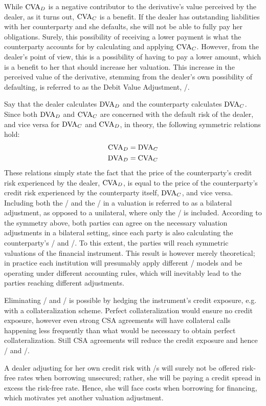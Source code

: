 \documentclass[main.tex]{subfiles}
\begin{document}
        While $\CVA/_{D}$ is a negative contributor to the derivative's value perceived by the dealer, 
        as it turns out, $\CVA/_{C}$ is a benefit.
        If the dealer has outstanding liabilities with her counterparty
        and she defaults, she will not be able to fully pay her obligations. 
        Surely, this possibility of receiving a lower payment is what the counterparty accounts for 
        by calculating and applying $\CVA/_{C}$.
        However, from the dealer's point of view, this is a possibility of having to pay a lower amount,
        which is a benefit to her that should increase her valuation.
        This increase in the perceived value of the derivative,
        stemming from the dealer's own possibility of defaulting, 
        is referred to as the Debit Value Adjustment, \DVA/.

        Say that the dealer calculates $\DVA/_{D}$ and the counterparty calculates $\DVA/_{C}$.
        Since both $\DVA/_{D}$ and $\CVA/_{C}$ are concerned with the default risk of the dealer,
        and vice versa for $\DVA/_{C}$ and $\CVA/_{D}$, in theory, the following symmetric relations hold:
            \begin{align*}
                \CVA/_{D} &= \DVA/_{C} \\
                \DVA/_{D} &= \CVA/_{C}
            \end{align*}
        These relations simply state the fact that
        the price of the counterparty's credit risk experienced by the dealer, $\CVA/_{D}$,
        is equal to the price of the counterparty's credit risk 
        experienced by the counterparty itself, $\DVA/_{C}$, and vice versa.
        Including both the \CVA/ and the \DVA/ in a valuation is referred to as a bilateral adjustment,
        as opposed to a unilateral, where only the \CVA/ is included.
        According to the symmetry above,
        both parties can agree on the necessary valuation adjustments in a bilateral setting,
        since each party is also calculating the counterparty's \CVA/ and \DVA/.
        To this extent, the parties will reach symmetric valuations of the financial instrument. 
        This result is however merely theoretical; 
        in practice each institution will presumably apply different \CVA/ models
        and be operating under different accounting rules, 
        which will inevitably lead to the parties reaching different adjustments. 
        
        Eliminating \CVA/ and \DVA/ is possible by hedging the instrument's credit exposure,
        e.g. with a collateralization scheme. 
        Perfect collateralization would ensure no credit exposure,
        however even strong CSA agreements will have collateral calls happening less frequently
        than what would be necessary to obtain perfect collateralization.
        Still CSA agreements will reduce the credit exposure and hence \CVA/ and \DVA/.

        A dealer adjusting for her own credit risk with \DVA/s
        will surely not be offered risk-free rates when borrowing unsecured;
        rather, she will be paying a credit spread in excess the risk-free rate.
        Hence, she will face costs when borrowing for financing,
        which motivates yet another valuation adjustment.
\end{document}

